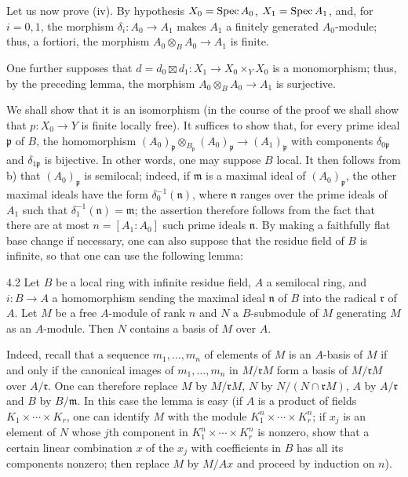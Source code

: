 Let us now prove (iv). By hypothesis $X_0=\operatorname{Spec} A_0$, $X_1=\operatorname{Spec} A_1$, and, for $i=0,1$, the morphism $\delta_i:A_0\to A_1$ makes $A_1$ a finitely generated $A_0$-module; thus, a fortiori, the morphism $A_0\otimes_BA_0\to A_1$ is finite.

One further supposes that $d=d_0\boxtimes d_1:X_1\to X_0\times_YX_0$ is a monomorphism; thus, by the preceding lemma, the morphism $A_0\otimes_BA_0\to A_1$ is surjective.

We shall show that it is an isomorphism (in the course of the proof we shall show that $p:X_0\to Y$ is finite locally free). It suffices to show that, for every prime ideal $\mathfrak p$ of $B$, the homomorphism $(A_0)_{\mathfrak p}\otimes_{B_{\mathfrak p}}(A_0)_{\mathfrak p}\to(A_1)_{\mathfrak p}$ with components $\delta_{0\mathfrak p}$ and $\delta_{1\mathfrak p}$ is bijective. In other words, one may suppose $B$ local. It then follows from b) that $(A_0)_{\mathfrak p}$ is semilocal; indeed, if $\mathfrak m$ is a maximal ideal of $(A_0)_{\mathfrak p}$, the other maximal ideals have the form $\delta_0^{-1}(\mathfrak n)$, where $\mathfrak n$ ranges over the prime ideals of $A_1$ such that $\delta_1^{-1}(\mathfrak n)=\mathfrak m$; the assertion therefore follows from the fact that there are at most $n=[A_1:A_0]$ such prime ideals $\mathfrak n$. By making a faithfully flat base change if necessary, one can also suppose that the residue field of $B$ is infinite, so that one can use the following lemma:
\begin{lemma}{4.2}\label{V.4.2}
Let $B$ be a local ring with infinite residue field, $A$ a semilocal ring, and $i:B\to A$ a homomorphism sending the maximal ideal $\mathfrak n$ of $B$ into the radical $\mathfrak r$ of $A$. Let $M$ be a free $A$-module of rank $n$ and $N$ a $B$-submodule of $M$ generating $M$ as an $A$-module. Then $N$ contains a basis of $M$ over $A$.
\end{lemma}
Indeed, recall that a sequence $m_1,\ldots,m_n$ of elements of $M$ is an $A$-basis of $M$ if and only if the canonical images of $m_1,\ldots,m_n$ in $M/\mathfrak rM$ form a basis of $M/\mathfrak rM$ over $A/\mathfrak r$. One can therefore replace $M$ by $M/\mathfrak rM$, $N$ by $N/(N\cap\mathfrak rM)$, $A$ by $A/\mathfrak r$ and $B$ by $B/\mathfrak m$. In this case the lemma is easy (if $A$ is a product of fields $K_1\times\cdots\times K_r$, one can identify $M$ with the module $K_1^n\times\cdots\times K_r^n$; if $x_j$ is an element of $N$ whose $j$th component in $K_1^n\times\cdots\times K_r^n$ is nonzero, show that a certain linear combination $x$ of the $x_j$ with coefficients in $B$ has all its components nonzero; then replace $M$ by $M/Ax$ and proceed by induction on $n$).

